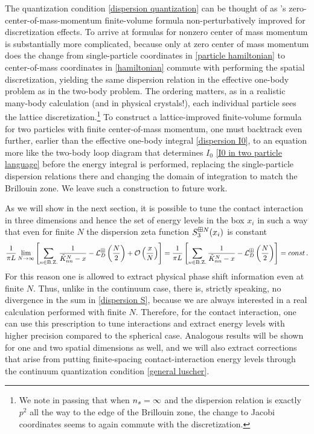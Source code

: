 The quantization condition \eqref{dispersion quantization} can be thought of as \Luscher's zero-center-of-mass-momentum finite-volume formula non-perturbatively improved for discretization effects.
To arrive at formulas for nonzero center of mass momentum is substantially more complicated, because only at zero center of mass momentum does the change from single-particle coordinates in \eqref{particle hamiltonian} to center-of-mass coordinates in \eqref{hamiltonian} commute with performing the spatial discretization, yielding the same dispersion relation in the effective one-body problem as in the two-body problem.
The ordering matters, as in a realistic many-body calculation (and in physical crystals!), each individual particle sees the lattice discretization.\footnote{
We note in passing that when ${n_s}=\infty$ and the dispersion relation is exactly $p^2$ all the way to the edge of the Brillouin zone, the change to Jacobi coordinates seems to again commute with the discretization.}
To construct a lattice-improved finite-volume formula for two particles with finite center-of-mass momentum, one must backtrack even further, earlier than the effective one-body integral \eqref{dispersion I0}, to an equation more like the two-body loop diagram that determines $I_0$ \eqref{I0 in two particle language} before the energy integral is performed, replacing the single-particle dispersion relations there and changing the domain of integration to match the Brillouin zone.
We leave such a construction to future work.

As we will show in the next section, it is possible to tune the contact interaction in three dimensions and hence the set of energy levels in the box $x_i$ in such a way that even for finite $N$ the dispersion zeta function $S^{\boxplus N}_{3}( x_i )$ is constant
\begin{equation}
	\frac{1}{\pi L}
	\lim_{N\rightarrow\infty}
	\left[
		\sum_{n\in\text{B.Z.}}\frac{1}{ \tilde K_{nn}^{N} - x}
		- \mathcal{L}_D^{\boxplus}\left(\frac{N}{2}\right)
		+ \mathcal O\left(\frac{x}{N}\right)
	\right]
	=
	\frac{1}{\pi L}
	\left[
		\sum_{n\in\text{B.Z.}}\frac{1}{ \tilde K_{nn}^{N} - x} - \mathcal{L}_D^{\boxplus}\left(\frac{N}{2}\right)
	\right]
	=
	const
	\, .
\end{equation}
For this reason one is allowed to extract physical phase shift information even at finite $N$.
Thus, unlike in the continuum case, there is, strictly speaking, no divergence in the sum in \eqref{dispersion S}, because we are always interested in a real calculation performed with finite $N$.
Therefore, for the contact interaction, one can use this prescription to tune interactions and extract energy levels with higher precision compared to the spherical case.
Analogous results will be shown for one and two spatial dimensions as well, and we will also extract corrections that arise from putting finite-spacing contact-interaction energy levels through the continuum quantization condition \eqref{general luscher}.

